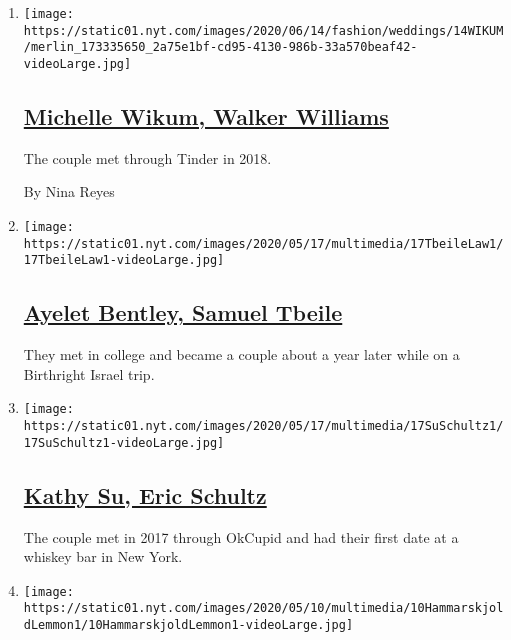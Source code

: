 \begin{enumerate}
\def\labelenumi{\arabic{enumi}.}
\item
  \texttt{[image: https://static01.nyt.com/images/2020/06/14/fashion/weddings/14WIKUM/merlin\_173335650\_2a75e1bf-cd95-4130-986b-33a570beaf42-videoLarge.jpg]}

  \hypertarget{michelle-wikum-walker-williams}{%
  \subsection{\texorpdfstring{\href{/2020/06/14/fashion/weddings/michelle-wikum-walker-williams.html}{Michelle
  Wikum, Walker
  Williams}}{Michelle Wikum, Walker Williams}}\label{michelle-wikum-walker-williams}}

  The couple met through Tinder in 2018.

  By Nina Reyes
\item
  \texttt{[image: https://static01.nyt.com/images/2020/05/17/multimedia/17TbeileLaw1/17TbeileLaw1-videoLarge.jpg]}

  \hypertarget{ayelet-bentley-samuel-tbeile}{%
  \subsection{\texorpdfstring{\href{/2020/05/17/fashion/weddings/ayelet-bentley-samuel-tbeile.html}{Ayelet
  Bentley, Samuel
  Tbeile}}{Ayelet Bentley, Samuel Tbeile}}\label{ayelet-bentley-samuel-tbeile}}

  They met in college and became a couple about a year later while on a
  Birthright Israel trip.
\item
  \texttt{[image: https://static01.nyt.com/images/2020/05/17/multimedia/17SuSchultz1/17SuSchultz1-videoLarge.jpg]}

  \hypertarget{kathy-su-eric-schultz}{%
  \subsection{\texorpdfstring{\href{/2020/05/17/fashion/weddings/kathy-su-eric-schultz.html}{Kathy
  Su, Eric
  Schultz}}{Kathy Su, Eric Schultz}}\label{kathy-su-eric-schultz}}

  The couple met in 2017 through OkCupid and had their first date at a
  whiskey bar in New York.
\item
  \texttt{[image: https://static01.nyt.com/images/2020/05/10/multimedia/10HammarskjoldLemmon1/10HammarskjoldLemmon1-videoLarge.jpg]}

  \hypertarget{victoria-hammarskjold-george-lemmon-iii}{%
}
\end{enumerate}

